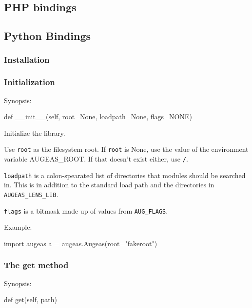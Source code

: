 \subsection{PHP bindings}


\subsection{Python Bindings}


\subsubsection{Installation}

\subsubsection{Initialization}

Synopsis:

\begin{python}[]
    def __init__(self, root=None, loadpath=None, flags=NONE)
\end{python}

Initialize the library.

Use \verb!root! as the filesystem root. If \verb!root! is None, use the value of the environment variable AUGEAS\_ROOT. If that doesn't exist either, use \nolinkurl{/}.

\verb!loadpath! is a colon-spearated list of directories that modules should be searched in. This is in addition to the standard load path and the directories in \verb!AUGEAS_LENS_LIB!.

\verb!flags! is a bitmask made up of values from \verb!AUG_FLAGS!.

Example:

\begin{python}[]
    import augeas
    a = augeas.Augeas(root="fakeroot")
\end{python}

\subsubsection{The get method}

Synopsis:

\begin{python}[]
    def get(self, path)
\end{python}

